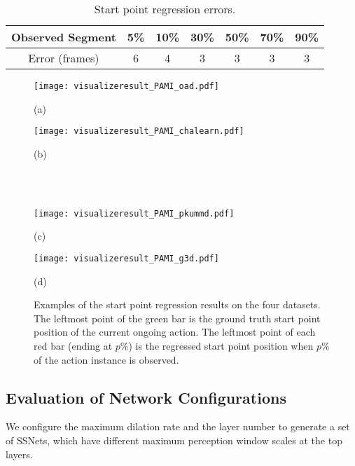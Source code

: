 \documentclass[10pt,twocolumn,letterpaper]{article}
\begin{document}
\begin{table}[tbp]
	\caption{Start point regression errors.}
	\label{table:resultRegErr}
	\centering
	\small
	\begin{tabular}{ccccccc}
		\toprule
Observed Segment       & 5\%   &   10\%   &    30\%   &    50\%    & 70\%  &  90\% \\
		\midrule
		Error (frames)         &   6   &    4     &    3      &    3       &  3    &  3   \\
		\bottomrule
	\end{tabular}
\end{table}



\begin{figure}[tbp]
\begin{minipage}[b]{0.5\linewidth}
		\centering
		\centerline{\texttt{[image: visualizeresult\_PAMI\_oad.pdf]}}
        (a)
\end{minipage}
\begin{minipage}[b]{0.49\linewidth}
		\centering
		\centerline{\texttt{[image: visualizeresult\_PAMI\_chalearn.pdf]}}
        (b)
\end{minipage}
\\
\\
\begin{minipage}[b]{0.5\linewidth}
		\centering
		\centerline{\texttt{[image: visualizeresult\_PAMI\_pkummd.pdf]}}
        (c)
	\end{minipage}
\begin{minipage}[b]{0.49\linewidth}
		\centering
		\centerline{\texttt{[image: visualizeresult\_PAMI\_g3d.pdf]}}
        (d)
\end{minipage}
	\caption{Examples of the start point regression results on the four datasets.
The leftmost point of the green bar is the ground truth start point position of the current ongoing action.
The leftmost point of each red bar (ending at $p$\%) is the regressed start point position when $p$\% of the action instance is observed.
}
	\label{fig:visualizeresult_pami}
\end{figure}



\subsection{Evaluation of Network Configurations}
\label{sec:experiment:netConfig}


We configure the maximum dilation rate and the layer number to generate a set of SSNets,
which have different maximum perception window scales at the top layers.
\end{document}
